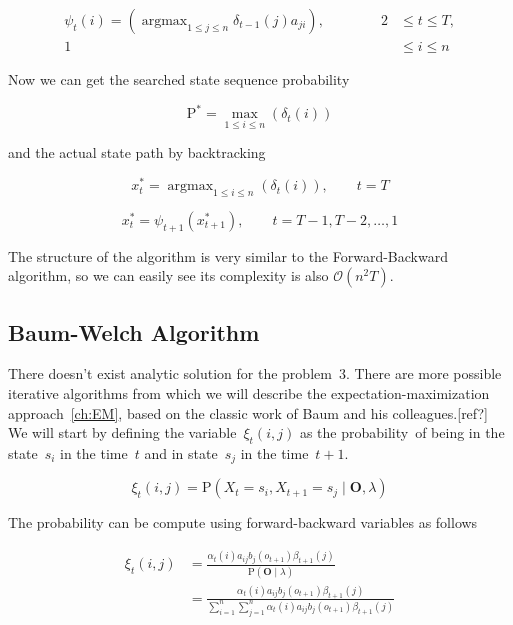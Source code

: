 \documentclass[thesis=M,english]{FITthesis}[2012/10/20]
\newcommand{\matr}[1]{\mathbf{#1}}
\newcommand{\argmax}{\mathop{\mathrm{argmax}}}
\begin{document}
\begin{equation}
\begin{aligned}
\psi_{t}(i) = ( \argmax_{ 1 \leq j \leq n } \delta_{t-1}(j)a_{ji} ), \qquad \qquad 2& \leq t \leq T, \\
																			       1& \leq i \leq n
\end{aligned}
\end{equation}

Now we can get the searched state sequence probability 

\begin{equation}
\mathrm{P}^* = \max_{1 \leq i \leq n} ( \delta_{t}(i) )  
\end{equation}

and the actual state path by backtracking

\begin{equation}
x_t^* = \argmax_{1 \leq i \leq n} ( \delta_{t}(i) ),  \qquad t = T  
\end{equation}

\begin{equation}
x_t^* = \psi_{t+1}(x_{t+1}^*), \qquad t = T-1, T-2, \dots, 1  
\end{equation}

The structure of the algorithm is very similar to the Forward-Backward algorithm, so we can easily see its complexity is also $\mathcal{O}(n^2T)$.

\subsection{Baum-Welch Algorithm}\label{sec:BWA}

There doesn't exist analytic solution for the problem~3. There are more possible iterative algorithms from which we will describe the expectation-maximization approach~\ref{ch:EM}, based on the classic work of Baum and his colleagues.[ref?] We will start by defining the variable~$\xi_t(i,j)$ as the probability~of being in the state~$s_i$ in the time~$t$ and in state~$s_j$ in the time~$t+1$. 

\begin{equation}
\xi_t(i,j) = \mathrm{P}( X_t = s_i, X_{t+1} = s_j \mid \matr{O}, \lambda )  
\end{equation}

The probability can be compute using forward-backward variables as follows
 
\begin{equation}\label{eq:xi}
\begin{aligned}
\xi_t(i,j) &= \frac{ \alpha_t(i) a_{ij} b_j(o_{t+1}) \beta_{t+1}(j) }
		   		   { \mathrm{P}( \matr{O} \mid \lambda ) } \\
		   &= \frac{ \alpha_t(i) a_{ij} b_j(o_{t+1}) \beta_{t+1}(j) }
		   		   { \sum\limits_{i=1}^n \sum\limits_{j=1}^n \alpha_t(i) a_{ij} b_j(o_{t+1}) \beta_{t+1}(j) }
\end{aligned}
\end{equation}
\end{document}
